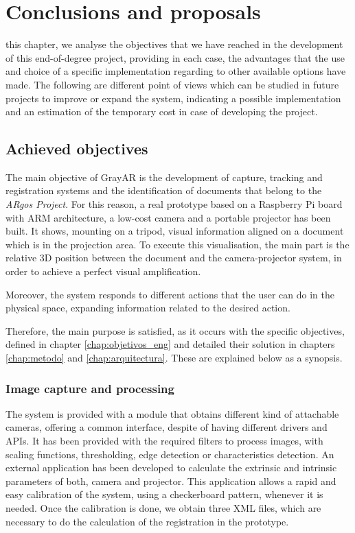 \chapter{Conclusions and proposals}
\label{chap:conclusiones_eng}

 this chapter, we analyse the objectives that we have reached in the development of this end-of-degree project, providing in each case, the advantages that the use and choice of a specific implementation regarding to other available options have made. The following are different point of views which can be studied in future projects to improve or expand the system, indicating a possible implementation and an estimation of the temporary cost in case of developing the project.


\section{Achieved objectives}
The main objective of GrayAR is the development of capture, tracking and registration systems and the identification of documents that belong to the \textit{ARgos Project}. For this reason, a real prototype based on a Raspberry Pi board with ARM architecture, a low-cost camera and a portable projector has been built. It shows, mounting on a tripod, visual information aligned on a document which is in the projection area. To execute this visualisation, the main part is the relative 3D position between the document and the camera-projector system, in order to achieve a perfect visual amplification.

Moreover, the system responds to different actions that the user can do in the physical space, expanding information related to the desired action. 

Therefore, the main purpose is satisfied, as it occurs with the specific objectives, defined in chapter \ref{chap:objetivos_eng} and detailed their solution in chapters \ref{chap:metodo} and \ref{chap:arquitectura}. These are explained below as a synopsis.


\subsection{Image capture and processing}
The system is provided with a module that obtains different kind of attachable cameras, offering a common interface, despite of having different drivers and APIs. It has been provided with the required filters to process images, with scaling functions, thresholding, edge detection or characteristics detection. An external application has been developed to calculate the extrinsic and intrinsic parameters of both, camera and projector. This application allows a rapid and easy calibration of the system, using a checkerboard pattern, whenever it is needed. Once the calibration is done, we obtain three XML files, which are necessary to do the calculation of the registration in the prototype.

